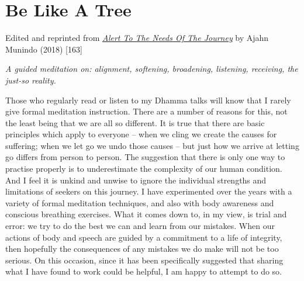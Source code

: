 \chapter{Be Like A Tree}

Edited and reprinted from
\emph{\href{https://forestsangha.org/teachings/books/alert-to-the-needs-of-the-journey?language=English}{Alert
To The Needs Of The Journey}} by Ajahn Munindo (2018) {[}163{]}

\emph{A guided meditation on: alignment, softening, broadening,
listening, receiving, the just-so reality.}

Those who regularly read or listen to my Dhamma talks will know that I
rarely give formal meditation instruction. There are a number of reasons
for this, not the least being that we are all so different. It is true
that there are basic principles which apply to everyone -- when we cling
we create the causes for suffering; when we let go we undo those causes
-- but just how we arrive at letting go differs from person to person.
The suggestion that there is only one way to practise properly is to
underestimate the complexity of our human condition. And I feel it is
unkind and unwise to ignore the individual strengths and limitations of
seekers on this journey. I have experimented over the years with a
variety of formal meditation techniques, and also with body awareness
and conscious breathing exercises. What it comes down to, in my view, is
trial and error: we try to do the best we can and learn from our
mistakes. When our actions of body and speech are guided by a commitment
to a life of integrity, then hopefully the consequences of any mistakes
we do make will not be too serious. On this occasion, since it has been
specifically suggested that sharing what I have found to work could be
helpful, I am happy to attempt to do so.

